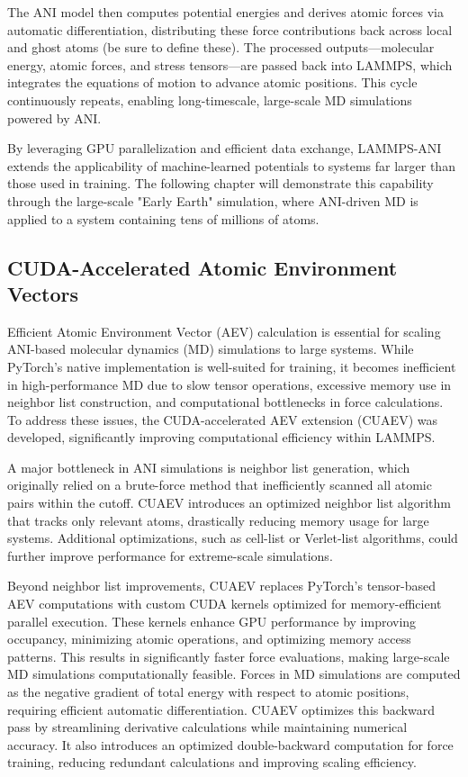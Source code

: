 The ANI model then computes potential energies and derives atomic forces via automatic differentiation, distributing these force contributions back across local and ghost atoms (be sure to define these). The processed outputs—molecular energy, atomic forces, and stress tensors—are passed back into LAMMPS, which integrates the equations of motion to advance atomic positions. This cycle continuously repeats, enabling long-timescale, large-scale MD simulations powered by ANI.

By leveraging GPU parallelization and efficient data exchange, LAMMPS-ANI extends the applicability of machine-learned potentials to systems far larger than those used in training. The following chapter will demonstrate this capability through the large-scale "Early Earth" simulation, where ANI-driven MD is applied to a system containing tens of millions of atoms.

\subsection{CUDA-Accelerated Atomic Environment Vectors}
\label{subsec:cuaevs}

Efficient Atomic Environment Vector (AEV) calculation is essential for scaling ANI-based molecular dynamics (MD) simulations to large systems. While PyTorch’s native implementation is well-suited for training, it becomes inefficient in high-performance MD due to slow tensor operations, excessive memory use in neighbor list construction, and computational bottlenecks in force calculations. To address these issues, the CUDA-accelerated AEV extension (CUAEV) was developed, significantly improving computational efficiency within LAMMPS.

A major bottleneck in ANI simulations is neighbor list generation, which originally relied on a brute-force method that inefficiently scanned all atomic pairs within the cutoff. CUAEV introduces an optimized neighbor list algorithm that tracks only relevant atoms, drastically reducing memory usage for large systems. Additional optimizations, such as cell-list or Verlet-list algorithms, could further improve performance for extreme-scale simulations.

Beyond neighbor list improvements, CUAEV replaces PyTorch’s tensor-based AEV computations with custom CUDA kernels optimized for memory-efficient parallel execution. These kernels enhance GPU performance by improving occupancy, minimizing atomic operations, and optimizing memory access patterns. This results in significantly faster force evaluations, making large-scale MD simulations computationally feasible. Forces in MD simulations are computed as the negative gradient of total energy with respect to atomic positions, requiring efficient automatic differentiation. CUAEV optimizes this backward pass by streamlining derivative calculations while maintaining numerical accuracy. It also introduces an optimized double-backward computation for force training, reducing redundant calculations and improving scaling efficiency.

